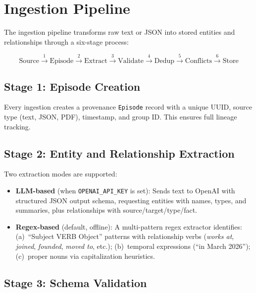 \documentclass[11pt,twocolumn]{article}
\begin{document}
\section{Ingestion Pipeline}
\label{sec:ingestion}

The ingestion pipeline transforms raw text or JSON into stored entities and relationships through a six-stage process:

\begin{equation}
\text{Source} \xrightarrow{1} \text{Episode} \xrightarrow{2} \text{Extract} \xrightarrow{3} \text{Validate} \xrightarrow{4} \text{Dedup} \xrightarrow{5} \text{Conflicts} \xrightarrow{6} \text{Store}
\end{equation}

\subsection{Stage 1: Episode Creation}

Every ingestion creates a provenance \texttt{Episode} record with a unique UUID, source type (text, JSON, PDF), timestamp, and group ID. This ensures full lineage tracking.

\subsection{Stage 2: Entity and Relationship Extraction}

Two extraction modes are supported:
\begin{itemize}[nosep]
  \item \textbf{LLM-based} (when \texttt{OPENAI\_API\_KEY} is set): Sends text to OpenAI with structured JSON output schema, requesting entities with names, types, and summaries, plus relationships with source/target/type/fact.
  \item \textbf{Regex-based} (default, offline): A multi-pattern regex extractor identifies: (a)~``Subject VERB Object'' patterns with relationship verbs (\emph{works at}, \emph{joined}, \emph{founded}, \emph{moved to}, etc.); (b)~temporal expressions (``in March 2026''); (c)~proper nouns via capitalization heuristics.
\end{itemize}

\subsection{Stage 3: Schema Validation}
\end{document}
